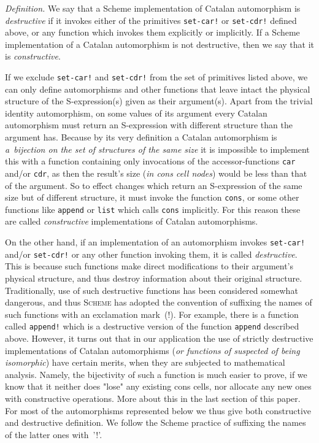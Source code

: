 \documentclass[11pt]{article} %
\newcommand{\proglangname}[1]{{\textsc{#1}}}
\newcommand{\scmsym}[1]{{\tt{#1}}}
\begin{document}
\textit{Definition.}
\textrm{We say that a Scheme implementation of Catalan automorphism is}
\textit{destructive}
\textrm{if it invokes either of the primitives} \scmsym{set-car!}
\textrm{or} \scmsym{set-cdr!}
\textrm{defined above, or any function which invokes them explicitly or implicitly.
If a Scheme implementation of a Catalan automorphism is not destructive,
then we say that it is}
\textit{constructive}.



If we exclude \scmsym{set-car!} and \scmsym{set-cdr!} from the
set of primitives listed above, we can only define automorphisms
and other functions that leave intact the physical structure of
the S-expression(s) given as their argument(s).
Apart from the trivial identity automorphism,
on some values of its argument
every Catalan automorphism must return an S-expression with different
structure than the argument has.
Because by its very definition a Catalan automorphism
is \textit{a~bijection on the set of structures of the same size}
it is impossible to implement this with a function
containing only invocations of the accessor-functions
\scmsym{car} and/or \scmsym{cdr},
as then the result's size (\textit{in cons cell nodes})
would be less than that of the argument.
So to effect changes which return an S-expression of the same size
but of different structure, it must invoke the function \scmsym{cons},
or some other functions like \scmsym{append} or \scmsym{list} which calls
\scmsym{cons} implicitly.
For this reason these are called \textit{constructive} implementations
of Catalan automorphisms.

On the other hand, if an implementation of an automorphism invokes
\scmsym{set-car!} and/or \scmsym{set-cdr!} or any other function
invoking them, it is called \textit{destructive}.
This is because such functions make direct modifications
to their argument's physical structure, and thus destroy
information about their original structure.
Traditionally, use of such destructive functions has been
considered somewhat dangerous, and thus \proglangname{Scheme} has adopted
the convention of suffixing the names of such functions
with an exclamation mark~(!). For example, there is
a function called \scmsym{append!} which is a destructive
version of the function \scmsym{append} described above.
However, it turns out that in our application the use
of strictly destructive implementations of Catalan automorphisms
(\textit{or functions of suspected of being isomorphic})
have certain merits, when they are subjected to mathematical
analysis. Namely, the bijectivity of such a function is much
easier to prove, if we know that it neither does "lose"
any existing cons cells, nor allocate any new ones
with constructive operations. More about this in the last
section of this paper.
For most of the automorphisms represented below we thus
give both constructive and destructive definition. We follow
the Scheme practice of suffixing the names of the latter ones
with~'!'.
\end{document}
